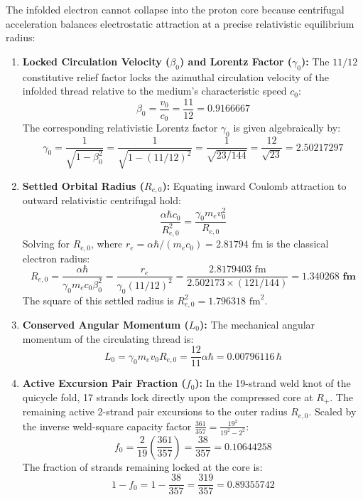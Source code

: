 \documentclass[11pt,a4paper]{article}
\begin{document}
The infolded electron cannot collapse into the proton core because centrifugal acceleration balances electrostatic attraction at a precise relativistic equilibrium radius:
\begin{enumerate}
    \item \textbf{Locked Circulation Velocity ($\beta_0$) and Lorentz Factor ($\gamma_0$):} The $11/12$ constitutive relief factor locks the azimuthal circulation velocity of the infolded thread relative to the medium's characteristic speed $c_0$:
    \begin{equation}
    \beta_0 = \frac{v_0}{c_0} = \frac{11}{12} = 0.9166667
    \end{equation}
    The corresponding relativistic Lorentz factor $\gamma_0$ is given algebraically by:
    \begin{equation}
    \gamma_0 = \frac{1}{\sqrt{1 - \beta_0^2}} = \frac{1}{\sqrt{1 - (11/12)^2}} = \frac{1}{\sqrt{23/144}} = \frac{12}{\sqrt{23}} = \mathbf{2.50217297}
    \end{equation}
    \item \textbf{Settled Orbital Radius ($R_{e,0}$):} Equating inward Coulomb attraction to outward relativistic centrifugal hold:
    \begin{equation}
    \frac{\alpha \hbar c_0}{R_{e,0}^2} = \frac{\gamma_0 m_e v_0^2}{R_{e,0}}
    \end{equation}
    Solving for $R_{e,0}$, where $r_e = \alpha\hbar / (m_e c_0) = 2.81794\text{ fm}$ is the classical electron radius:
    \begin{equation}
    R_{e,0} = \frac{\alpha \hbar}{\gamma_0 m_e c_0 \beta_0^2} = \frac{r_e}{\gamma_0 (11/12)^2} = \frac{2.8179403\text{ fm}}{2.502173 \times (121/144)} = \mathbf{1.340268\text{ fm}}
    \end{equation}
    The square of this settled radius is $R_{e,0}^2 = 1.796318\text{ fm}^2$.
    \item \textbf{Conserved Angular Momentum ($L_0$):} The mechanical angular momentum of the circulating thread is:
    \begin{equation}
    L_0 = \gamma_0 m_e v_0 R_{e,0} = \frac{12}{11}\alpha \hbar = 0.00796116\,\hbar
    \end{equation}
    \item \textbf{Active Excursion Pair Fraction ($f_0$):} In the 19-strand weld knot of the quicycle fold, 17 strands lock directly upon the compressed core at $R_+$. The remaining active 2-strand pair excursions to the outer radius $R_{e,0}$. Scaled by the inverse weld-square capacity factor $\frac{361}{357} = \frac{19^2}{19^2 - 2^2}$:
    \begin{equation}
    f_0 = \frac{2}{19}\left(\frac{361}{357}\right) = \frac{38}{357} = \mathbf{0.10644258}
    \end{equation}
    The fraction of strands remaining locked at the core is:
    \begin{equation}
    1 - f_0 = 1 - \frac{38}{357} = \frac{319}{357} = \mathbf{0.89355742}
    \end{equation}
\end{enumerate}
\end{document}
